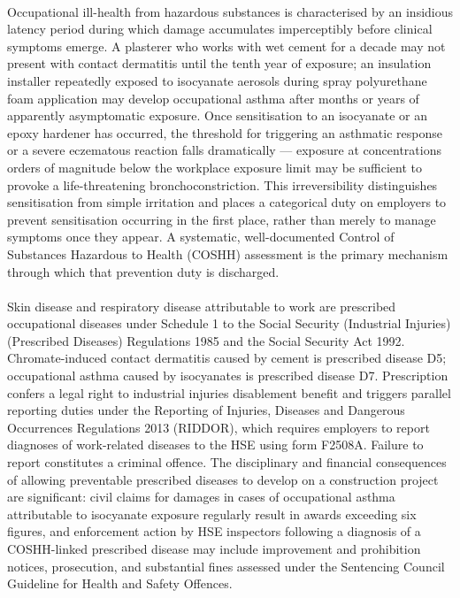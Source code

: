 \paragraph{}
Occupational ill-health from hazardous substances is characterised by an insidious latency period during which damage accumulates imperceptibly before clinical symptoms emerge. A plasterer who works with wet cement for a decade may not present with contact dermatitis until the tenth year of exposure; an insulation installer repeatedly exposed to isocyanate aerosols during spray polyurethane foam application may develop occupational asthma after months or years of apparently asymptomatic exposure. Once sensitisation to an isocyanate or an epoxy hardener has occurred, the threshold for triggering an asthmatic response or a severe eczematous reaction falls dramatically — exposure at concentrations orders of magnitude below the workplace exposure limit may be sufficient to provoke a life-threatening bronchoconstriction. This irreversibility distinguishes sensitisation from simple irritation and places a categorical duty on employers to prevent sensitisation occurring in the first place, rather than merely to manage symptoms once they appear. A systematic, well-documented Control of Substances Hazardous to Health (COSHH) assessment is the primary mechanism through which that prevention duty is discharged.

\paragraph{}
Skin disease and respiratory disease attributable to work are prescribed occupational diseases under Schedule 1 to the Social Security (Industrial Injuries)(Prescribed Diseases) Regulations 1985 and the Social Security Act 1992. Chromate-induced contact dermatitis caused by cement is prescribed disease D5; occupational asthma caused by isocyanates is prescribed disease D7. Prescription confers a legal right to industrial injuries disablement benefit and triggers parallel reporting duties under the Reporting of Injuries, Diseases and Dangerous Occurrences Regulations 2013 (RIDDOR), which requires employers to report diagnoses of work-related diseases to the HSE using form F2508A. Failure to report constitutes a criminal offence. The disciplinary and financial consequences of allowing preventable prescribed diseases to develop on a construction project are significant: civil claims for damages in cases of occupational asthma attributable to isocyanate exposure regularly result in awards exceeding six figures, and enforcement action by HSE inspectors following a diagnosis of a COSHH-linked prescribed disease may include improvement and prohibition notices, prosecution, and substantial fines assessed under the Sentencing Council Guideline for Health and Safety Offences.

